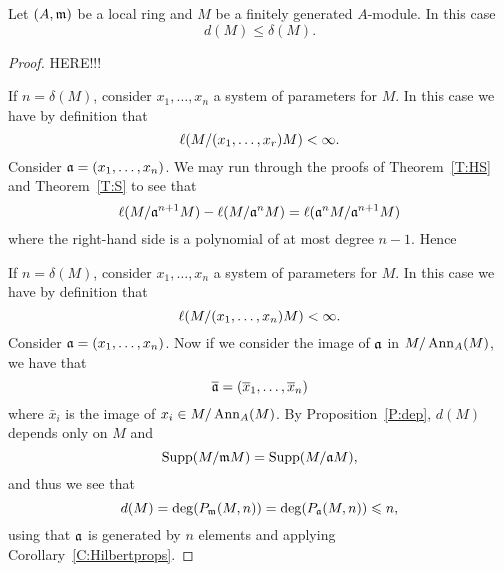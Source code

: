 \documentclass{ximera}
\begin{document}
\begin{lemma}
  Let $(A,\mathfrak{m})$ be a local ring and $M$ be a finitely generated
  $A$-module. In this case
  \[
  d(M)\le \delta(M).
  \]
  \begin{proof}

    HERE!!!

    
    If $n =\delta(M)$, consider $x_1,\dots,x_n$ a system of parameters for
    $M$. In this case we have by definition that
    \[
    \ell(M/(x_1,\dots,x_r)M)<\infty.
    \] 
    Consider $\mathfrak{a} = (x_1,\dots,x_n)$. We may run through the proofs of
    Theorem~\ref{T:HS} and Theorem~\ref{T:S} to see that
    \[
    \ell(M/\mathfrak{a}^{n+1} M)  - \ell(M/\mathfrak{a}^n M)  = \ell(\mathfrak{a}^n M/\mathfrak{a}^{n+1} M)
    \]
    where the right-hand side is a polynomial of at most degree $n-1$. Hence
    



    
    If $n =\delta(M)$, consider $x_1,\dots,x_n$ a system of parameters for
    $M$. In this case we have by definition that
    \[
    \ell(M/(x_1,\dots,x_n)M)<\infty.
    \] 
    Consider $\mathfrak{a} = (x_1,\dots,x_n)$. Now if we consider the image of
    $\mathfrak{a}$ in $M/\operatorname{Ann}_A(M)$, we have that
    \[
    \overline{\mathfrak{a}} = (\overline{x}_1, \dots, \overline{x}_n)
    \]
    where $\bar{x}_i$ is the image of $x_i\in M/\operatorname{Ann}_A(M)$. By
    Proposition~\ref{P:dep}, $d(M)$ depends only on $M$ and
    \[
    \operatorname{Supp}(M/\mathfrak{m} M) =\operatorname{Supp}(M/\mathfrak{a} M),
    \]
    and thus we see that 
    \[
    d(M) = \deg(P_{\mathfrak{m}}(M,n)) = \deg(P_{\mathfrak{a}}(M,n))\leqslant n,
    \]
    using that $\mathfrak{a}$ is generated by $n$ elements and applying
    Corollary~\ref{C:Hilbertprops}.
  \end{proof}
\end{lemma}
\end{document}
